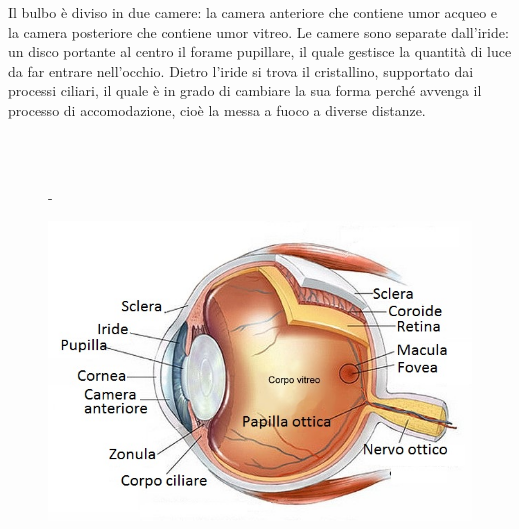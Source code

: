 Il bulbo è diviso in due camere: la camera anteriore che contiene umor acqueo e la camera posteriore che contiene umor vitreo. Le camere sono separate dall’iride: un disco portante al centro il forame pupillare, il quale gestisce la quantità di luce da far entrare nell’occhio. Dietro l’iride si trova il cristallino, supportato dai processi ciliari, il quale è in grado di cambiare la sua forma perché avvenga il processo di accomodazione, cioè la messa a fuoco a diverse distanze.

\\\


\begin{figure}[h!]- 
\centering
\begin{minipage}{.5\textwidth}
  \centering
  \includegraphics[scale=1.0]{source/immagini/anatomia_occhio.jpg}
  \label{fig:test1}
\end{minipage}%
\begin{minipage}{.5\textwidth}
  \centering

\end{minipage}
\end{figure}
